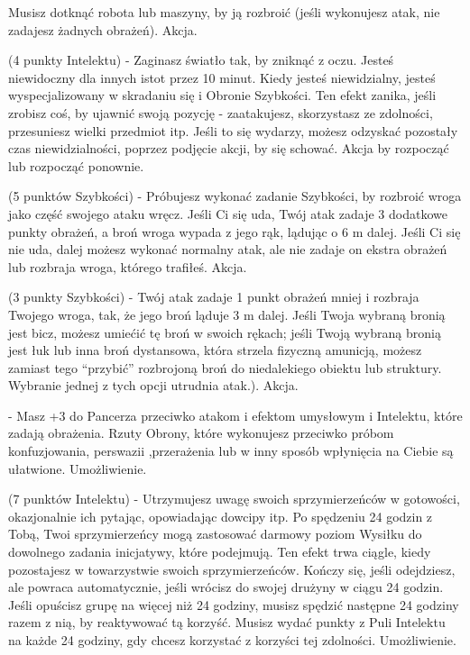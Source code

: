 {Musisz dotknąć robota lub maszyny, by ją rozbroić (jeśli wykonujesz atak, nie zadajesz żadnych obrażeń). Akcja.

 (4 punkty Intelektu) - Zaginasz światło tak, by zniknąć z oczu. Jesteś niewidoczny dla innych istot przez 10 minut. Kiedy jesteś niewidzialny, jesteś wyspecjalizowany w skradaniu się i Obronie Szybkości. Ten efekt zanika, jeśli zrobisz coś, by ujawnić swoją pozycję - zaatakujesz, skorzystasz ze zdolności, przesuniesz wielki przedmiot itp. Jeśli to się wydarzy, możesz odzyskać pozostały czas niewidzialności, poprzez podjęcie akcji, by się schować. Akcja by rozpocząć lub rozpocząć ponownie.

 (5 punktów Szybkości) - Próbujesz wykonać zadanie Szybkości, by rozbroić wroga jako część swojego ataku wręcz. Jeśli Ci się uda, Twój atak zadaje 3 dodatkowe punkty obrażeń, a broń wroga wypada z jego rąk, lądując o 6 m dalej. Jeśli Ci się nie uda, dalej możesz wykonać normalny atak, ale nie zadaje on ekstra obrażeń lub rozbraja wroga, którego trafiłeś. Akcja.

 (3 punkty Szybkości) - Twój atak zadaje 1 punkt obrażeń mniej i rozbraja Twojego wroga, tak, że jego broń ląduje 3 m dalej. Jeśli Twoja wybraną bronią jest bicz, możesz umiećić tę broń w swoich rękach; jeśli Twoją wybraną bronią jest łuk lub inna broń dystansowa, która strzela fizyczną amunicją, możesz zamiast tego ``przybić'' rozbrojoną broń do niedalekiego obiektu lub struktury. Wybranie jednej z tych opcji utrudnia atak.). Akcja.

 - Masz +3 do Pancerza przeciwko atakom i efektom umysłowym i Intelektu, które zadają obrażenia. Rzuty Obrony, które wykonujesz przeciwko próbom konfuzjowania, perswazii ,przerażenia lub w inny sposób wpłynięcia na Ciebie są ułatwione. Umożliwienie.

 (7 punktów Intelektu) - Utrzymujesz uwagę swoich sprzymierzeńców w gotowości, okazjonalnie ich pytając, opowiadając dowcipy itp. Po spędzeniu 24 godzin z Tobą, Twoi sprzymierzeńcy mogą zastosować darmowy poziom Wysiłku do dowolnego zadania inicjatywy, które podejmują. Ten efekt trwa ciągle, kiedy pozostajesz w towarzystwie swoich sprzymierzeńców. Kończy się, jeśli odejdziesz, ale powraca automatycznie, jeśli wrócisz do swojej drużyny w ciągu 24 godzin. Jeśli opuścisz grupę na więcej niż 24 godziny, musisz spędzić następne 24 godziny razem z nią, by reaktywować tą korzyść.  Musisz wydać punkty z Puli Intelektu na każde 24 godziny, gdy chcesz korzystać z korzyści tej zdolności. Umożliwienie.

}
